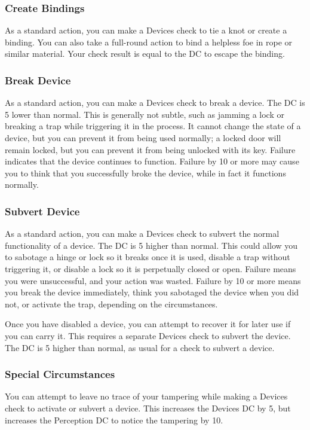 \subsubsection{Create Bindings}
As a standard action, you can make a Devices check to tie a knot or create a binding. You can also take a full-round action to bind a helpless foe in rope or similar material. Your check result is equal to the DC to escape the binding.

\subsubsection{Break Device}
As a standard action, you can make a Devices check to break a device. The DC is 5 lower than normal. This is generally not subtle, such as jamming a lock or breaking a trap while triggering it in the process. It cannot change the state of a device, but you can prevent it from being used normally; a locked door will remain locked, but you can prevent it from being unlocked with its key. Failure indicates that the device continues to function. Failure by 10 or more may cause you to think that you successfully broke the device, while in fact it functions normally.

\subsubsection{Subvert Device}
As a standard action, you can make a Devices check to subvert the normal functionality of a device. The DC is 5 higher than normal. This could allow you to sabotage a hinge or lock so it breaks once it is used, disable a trap without triggering it, or disable a lock so it is perpetually closed or open. Failure means you were unsuccessful, and your action was wasted. Failure by 10 or more means you break the device immediately, think you sabotaged the device when you did not, or activate the trap, depending on the circumstances.

Once you have disabled a device, you can attempt to recover it for later use if you can carry it. This requires a separate Devices check to subvert the device. The DC is 5 higher than normal, as usual for a check to subvert a device.

\subsubsection{Special Circumstances}

You can attempt to leave no trace of your tampering while making a Devices check to activate or subvert a device. This increases the Devices DC by 5, but increases the Perception DC to notice the tampering by 10.

